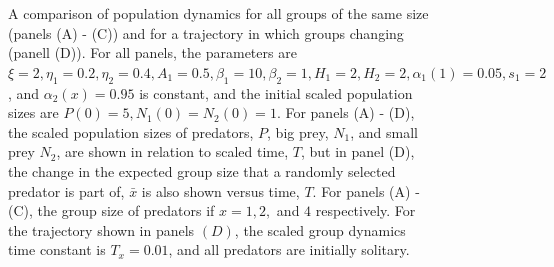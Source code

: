 \begin{figure}[htbp]
\caption{A comparison of population dynamics  for all groups of the same size (panels (A) - (C)) and for a trajectory in which groups changing (panell (D)). For all panels, the parameters are $\xi = 2, \eta_1 = 0.2, \eta_2 = 0.4, A_1 = 0.5, \beta_1 = 10, \beta_2 = 1, H_1 = 2, H_2 = 2, \alpha_1(1) = 0.05, s_1 =2$, and $\alpha_2(x) = 0.95$ is constant, and the initial scaled population sizes are $P(0) =5, N_1(0) = N_2(0) = 1$. For panels (A) - (D), the scaled population sizes of predators, $P$, big prey, $N_1$, and small prey $N_2$, are shown in relation to scaled time, $T$, but in panel (D), the change in the expected group size that a randomly selected predator is part of, $\bar{x}$ is also shown versus time, $T$. For panels (A) - (C), the group size of predators if $x = 1, 2,$ and $4$ respectively. For the trajectory shown in panels $(D)$, the scaled group dynamics time constant is $T_x = 0.01$, and all predators are initially solitary.}
\label{compare_onegrp_fission_fusion}
\end{figure}
